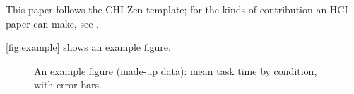\documentclass[manuscript,review,anonymous]{acmart}
\begin{document}
This paper follows the CHI Zen template; for the kinds of contribution an HCI
paper can make, see \citet{wobbrock2016research}.

\autoref{fig:example} shows an example figure.

\begin{figure}[tb]
  \centering
  \caption{An example figure (made-up data): mean task time by condition,
    with error bars.}
  \label{fig:example}
\end{figure}


%
%
%

%

%

%

%

%

%

%

%

%




%
\end{document}
